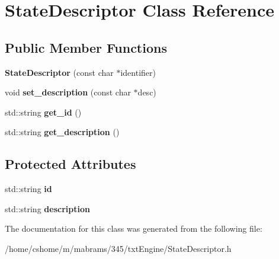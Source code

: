 \hypertarget{class_state_descriptor}{
\section{StateDescriptor Class Reference}
\label{class_state_descriptor}
}
\subsection*{Public Member Functions}
\begin{DoxyCompactItemize}
\item 
\hypertarget{class_state_descriptor_afc148468d8cd45e8a109a9ed887ef729}{
{\bfseries StateDescriptor} (const char $\ast$identifier)}
\label{class_state_descriptor_afc148468d8cd45e8a109a9ed887ef729}

\item 
\hypertarget{class_state_descriptor_a58265248efa7a27af7e6bbddeab1d74a}{
void {\bfseries set\_\-description} (const char $\ast$desc)}
\label{class_state_descriptor_a58265248efa7a27af7e6bbddeab1d74a}

\item 
\hypertarget{class_state_descriptor_a86c0070f308c636a19693a009f0a5464}{
std::string {\bfseries get\_\-id} ()}
\label{class_state_descriptor_a86c0070f308c636a19693a009f0a5464}

\item 
\hypertarget{class_state_descriptor_affa74bf68afccd61d263bbbb4b9419ea}{
std::string {\bfseries get\_\-description} ()}
\label{class_state_descriptor_affa74bf68afccd61d263bbbb4b9419ea}

\end{DoxyCompactItemize}
\subsection*{Protected Attributes}
\begin{DoxyCompactItemize}
\item 
\hypertarget{class_state_descriptor_a6e9e403fcf97cda1dc40bda6428af294}{
std::string {\bfseries id}}
\label{class_state_descriptor_a6e9e403fcf97cda1dc40bda6428af294}

\item 
\hypertarget{class_state_descriptor_ae1f4cb2426dd97e0afe6d036c9cd9913}{
std::string {\bfseries description}}
\label{class_state_descriptor_ae1f4cb2426dd97e0afe6d036c9cd9913}

\end{DoxyCompactItemize}


The documentation for this class was generated from the following file:\begin{DoxyCompactItemize}
\item 
/home/cshome/m/mabrams/345/txtEngine/StateDescriptor.h\end{DoxyCompactItemize}
